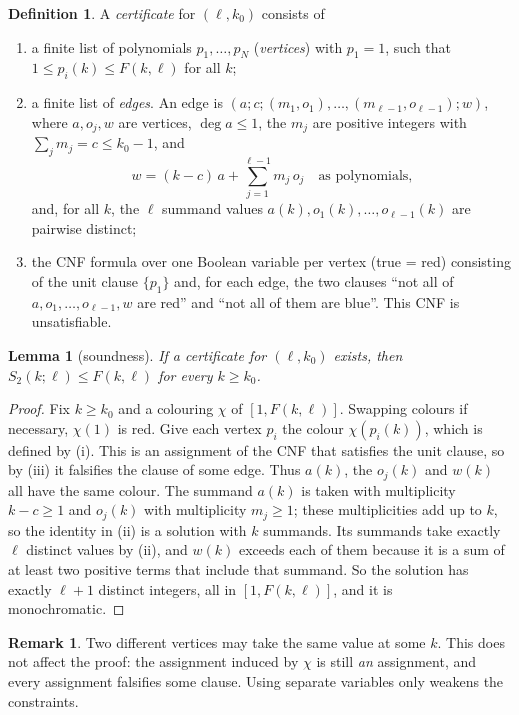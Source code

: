\documentclass[11pt]{amsart}
\newtheorem{lemma}[theorem]{Lemma}
\theoremstyle{definition}
\newtheorem{definition}[theorem]{Definition}
\newtheorem{remark}[theorem]{Remark}
\newcommand{\F}{F}
\newcommand{\Stwo}{S_2}
\begin{document}
\begin{definition}\label{def:cert}
A \emph{certificate} for $(\ell,k_0)$ consists of
\begin{enumerate}[label=(\roman*)]
\item a finite list of polynomials $p_1,\dots,p_N$ (\emph{vertices}) with $p_1=1$, such that $1\le p_i(k)\le\F(k,\ell)$ for all $k$;
\item a finite list of \emph{edges}. An edge is $(a;c;(m_1,o_1),\dots,(m_{\ell-1},o_{\ell-1});w)$, where $a,o_j,w$ are vertices, $\deg a\le1$, the $m_j$ are positive integers with $\sum_j m_j=c\le k_0-1$, and
\[ w=(k-c)\,a+\sum_{j=1}^{\ell-1} m_j\,o_j \quad\text{as polynomials,} \]
and, for all $k$, the $\ell$ summand values $a(k),o_1(k),\dots,o_{\ell-1}(k)$ are pairwise distinct;
\item the CNF formula over one Boolean variable per vertex (true = red) consisting of the unit clause $\{p_1\}$ and, for each edge, the two clauses ``not all of $a,o_1,\dots,o_{\ell-1},w$ are red'' and ``not all of them are blue''. This CNF is unsatisfiable.
\end{enumerate}
\end{definition}

\begin{lemma}[soundness]\label{lem:sound}
If a certificate for $(\ell,k_0)$ exists, then $\Stwo(k;\ell)\le\F(k,\ell)$ for every $k\ge k_0$.
\end{lemma}

\begin{proof}
Fix $k\ge k_0$ and a colouring $\chi$ of $[1,\F(k,\ell)]$. Swapping colours if necessary, $\chi(1)$ is red. Give each vertex $p_i$ the colour $\chi(p_i(k))$, which is defined by (i). This is an assignment of the CNF that satisfies the unit clause, so by (iii) it falsifies the clause of some edge. Thus $a(k)$, the $o_j(k)$ and $w(k)$ all have the same colour. The summand $a(k)$ is taken with multiplicity $k-c\ge1$ and $o_j(k)$ with multiplicity $m_j\ge1$; these multiplicities add up to $k$, so the identity in (ii) is a solution with $k$ summands. Its summands take exactly $\ell$ distinct values by (ii), and $w(k)$ exceeds each of them because it is a sum of at least two positive terms that include that summand. So the solution has exactly $\ell+1$ distinct integers, all in $[1,\F(k,\ell)]$, and it is monochromatic.
\end{proof}

\begin{remark}
Two different vertices may take the same value at some $k$. This does not affect the proof: the assignment induced by $\chi$ is still \emph{an} assignment, and every assignment falsifies some clause. Using separate variables only weakens the constraints.
\end{remark}
\end{document}
